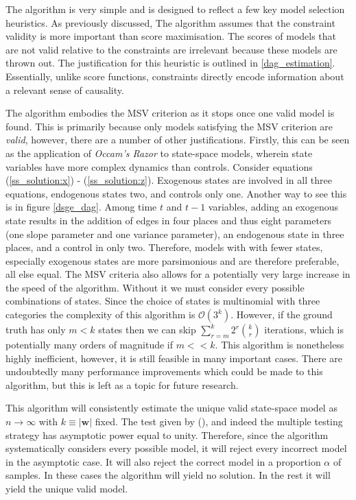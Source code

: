 \documentclass{article}
\begin{document}
The algorithm is very simple and is designed to reflect a few key model selection heuristics. As previously discussed, The algorithm assumes that the constraint validity is more important than score maximisation. The scores of models that are not valid relative to the constraints are irrelevant because these models are thrown out. The justification for this heuristic is outlined in \ref{dag_estimation}. Essentially, unlike score functions, constraints directly encode information about a relevant sense of causality.

The algorithm embodies the MSV criterion as it stops once one valid model is found. This is primarily because only models satisfying the MSV criterion are \textit{valid}, however, there are a number of other justifications. Firstly, this can be seen as the application of \textit{Occam's Razor} to state-space models, wherein state variables have more complex dynamics than controls. Consider equations (\ref{ss_solution:x}) - (\ref{ss_solution:z}). Exogenous states are involved in all three equations, endogenous states two, and controls only one. Another way to see this is in figure \ref{dsge_dag}. Among time $t$ and $t-1$ variables, adding an exogenous state results in the addition of edges in four places and thus eight parameters (one slope parameter and one variance parameter), an endogenous state in three places, and a control in only two. Therefore, models with with fewer states, especially exogenous states are more parsimonious and are therefore preferable, all else equal. The MSV criteria also allows for a potentially very large increase in the speed of the algorithm. Without it we must consider every possible combinations of states. Since the choice of states is multinomial with three categories the complexity of this algorithm is $\mathcal{O}(3^k)$. However, if the ground truth has only $m < k$ states then we can skip $\sum_{r=m}^{k} 2^r {\binom{k}{r}}$ iterations, which is potentially many orders of magnitude if $m << k$. This algorithm is nonetheless highly inefficient, however, it is still feasible in many important cases. There are undoubtedly many performance improvements which could be made to this algorithm, but this is left as a topic for future research.

This algorithm will consistently estimate the unique valid state-space model as $n \rightarrow \infty$ with $k \equiv |\mathbf{w}|$ fixed. The test given by \citeauthor{srivastava2005some} (\citeyear{srivastava2005some}), and indeed the multiple testing strategy has asymptotic power equal to unity. Therefore, since the algorithm systematically considers every possible model, it will reject every incorrect model in the asymptotic case. It will also reject the correct model in a proportion $\alpha$ of samples. In these cases the algorithm will yield no solution. In the rest it will yield the unique valid model. 
\end{document}
